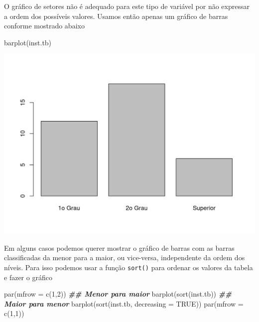 \documentclass[
  10pt,
  a4paper]{book}
\newenvironment{Shaded}{\begin{snugshade}}{\end{snugshade}}
\newcommand{\AttributeTok}[1]{\textcolor[rgb]{0.77,0.63,0.00}{#1}}
\newcommand{\ConstantTok}[1]{\textcolor[rgb]{0.00,0.00,0.00}{#1}}
\newcommand{\DecValTok}[1]{\textcolor[rgb]{0.00,0.00,0.81}{#1}}
\newcommand{\DocumentationTok}[1]{\textcolor[rgb]{0.56,0.35,0.01}{\textbf{\textit{#1}}}}
\newcommand{\FunctionTok}[1]{\textcolor[rgb]{0.00,0.00,0.00}{#1}}
\newcommand{\NormalTok}[1]{#1}
\begin{document}
O gráfico de setores não é adequado para este tipo de variável por não
expressar a ordem dos possíveis valores. Usamos então apenas um gráfico
de barras conforme mostrado abaixo

\begin{Shaded}
\begin{Highlighting}[]
\FunctionTok{barplot}\NormalTok{(inst.tb)}
\end{Highlighting}
\end{Shaded}

\begin{center}\includegraphics{figures/unnamed-chunk-298-1} \end{center}

Em alguns casos podemos querer mostrar o gráfico de barras com as barras
classificadas da menor para a maior, ou vice-versa, independente da
ordem dos níveis. Para isso podemos usar a função \texttt{sort()} para ordenar
os valores da tabela e fazer o gráfico

\begin{Shaded}
\begin{Highlighting}[]
\FunctionTok{par}\NormalTok{(}\AttributeTok{mfrow =} \FunctionTok{c}\NormalTok{(}\DecValTok{1}\NormalTok{,}\DecValTok{2}\NormalTok{))}
\DocumentationTok{\#\# Menor para maior}
\FunctionTok{barplot}\NormalTok{(}\FunctionTok{sort}\NormalTok{(inst.tb))}
\DocumentationTok{\#\# Maior para menor}
\FunctionTok{barplot}\NormalTok{(}\FunctionTok{sort}\NormalTok{(inst.tb, }\AttributeTok{decreasing =} \ConstantTok{TRUE}\NormalTok{))}
\FunctionTok{par}\NormalTok{(}\AttributeTok{mfrow =} \FunctionTok{c}\NormalTok{(}\DecValTok{1}\NormalTok{,}\DecValTok{1}\NormalTok{))}
\end{Highlighting}
\end{Shaded}
\end{document}
